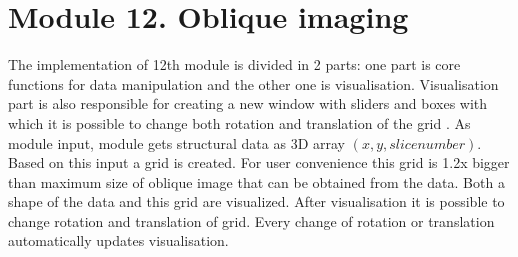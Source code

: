 \section{Module 12. Oblique imaging}

\indent The implementation of 12th module is divided in 2 parts: one part is core functions for data manipulation and the other one is visualisation. Visualisation part is also responsible for creating a new window with sliders and boxes with which it is possible to change both rotation and translation of the grid . 
\newline \indent As module input, module gets structural data as 3D array $(x, y, slice number)$. Based on this input a grid is created. For user convenience this grid is 1.2x bigger than maximum size of oblique image that can be obtained from the data. Both a shape of the data and this grid are visualized.
\newline\indent After visualisation it is possible to change rotation and translation of grid. Every change of rotation or translation automatically updates visualisation.

